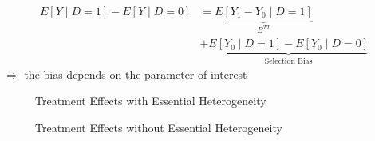 \begin{frame}
\begin{align*}
E[Y\mid D = 1] - E[Y\mid D = 0] & = \underbrace{E[Y_1 - Y_0\mid D = 1]}_{B^{TT}} \\
								& + \underbrace{E[Y_0\mid D= 1]- E[Y_0 \mid D = 0]}_{\text{Selection Bias}}
\end{align*}
\(\Rightarrow\) the bias depends on the parameter of interest
\end{frame}


\begin{frame}
\begin{figure}[htp]\centering
	\caption{Treatment Effects with Essential Heterogeneity}\label{Treatment Effects Conventional}			
\end{figure}
\end{frame}


\begin{frame}
\begin{figure}[htp]\centering
	\caption{Treatment Effects without Essential Heterogeneity}\label{Treatment Effects Without Essential Heterogeneity}
\end{figure}
\end{frame}


